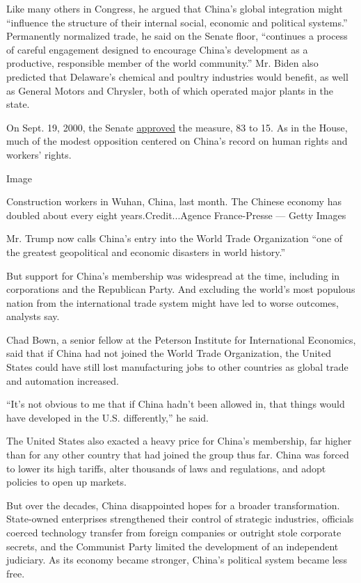 Like many others in Congress, he argued that China's global integration
might ``influence the structure of their internal social, economic and
political systems.'' Permanently normalized trade, he said on the Senate
floor, ``continues a process of careful engagement designed to encourage
China's development as a productive, responsible member of the world
community.'' Mr. Biden also predicted that Delaware's chemical and
poultry industries would benefit, as well as General Motors and
Chrysler, both of which operated major plants in the state.

On Sept. 19, 2000, the Senate
\href{https://www.nytimes3xbfgragh.onion/2000/09/20/news/final-passage-of-bill-to-normalize-us-ties-is-approved-83-to-15-senate.html}{approved}
the measure, 83 to 15. As in the House, much of the modest opposition
centered on China's record on human rights and workers' rights.

Image

Construction workers in Wuhan, China, last month. The Chinese economy
has doubled about every eight years.Credit...Agence France-Presse ---
Getty Images

Mr. Trump now calls China's entry into the World Trade Organization
``one of the greatest geopolitical and economic disasters in world
history.''

But support for China's membership was widespread at the time, including
in corporations and the Republican Party. And excluding the world's most
populous nation from the international trade system might have led to
worse outcomes, analysts say.

Chad Bown, a senior fellow at the Peterson Institute for International
Economics, said that if China had not joined the World Trade
Organization, the United States could have still lost manufacturing jobs
to other countries as global trade and automation increased.

``It's not obvious to me that if China hadn't been allowed in, that
things would have developed in the U.S. differently,'' he said.

The United States also exacted a heavy price for China's membership, far
higher than for any other country that had joined the group thus far.
China was forced to lower its high tariffs, alter thousands of laws and
regulations, and adopt policies to open up markets.

But over the decades, China disappointed hopes for a broader
transformation. State-owned enterprises strengthened their control of
strategic industries, officials coerced technology transfer from foreign
companies or outright stole corporate secrets, and the Communist Party
limited the development of an independent judiciary. As its economy
became stronger, China's political system became less free.


